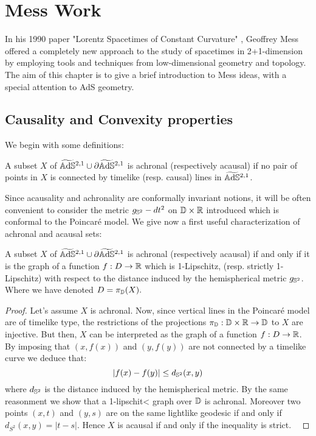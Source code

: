 \chapter{Mess Work}

In his 1990 paper "Lorentz Spacetimes of Constant Curvature" \cite{Mess}, Geoffrey Mess offered a completely new approach to the study of spacetimes in 2+1-dimension by employing tools and techniques from low-dimensional geometry and topology. The aim of this chapter is to give a brief introduction to Mess ideas, with a special attention to AdS geometry. 

\section{Causality and Convexity properties}
We begin with some definitions:
\begin{definition}
    A subset $X$ of $\AS^{2,1}\cup \partial\AS^{2,1}$ is achronal (respectively acausal) if no pair of points in $X$ is connected by timelike (resp. causal) lines in $\AS^{2,1}$.
\end{definition}
Since acausality and achronality are conformally invariant notions, it will be often convenient to consider the metric $g_{\S^2}-dt^2$ on $\D\times\R$ introduced  which is conformal to the Poincaré model. We give now a first useful characterization of achronal and acausal sets:
\begin{lemma}
    A subset $X$ of $\AS^{2,1}\cup \partial\AS^{2,1}$ is achronal (respectively acausal) if and only if it is the graph of a function $f:D\to\R$ which is 1-Lipschitz, (resp. strictly 1-Lipschitz) with respect to the distance induced by the hemispherical metric $g_{\S^2}$.\\
    Where we have denoted $D=\pi_{\D}(X).$ 
\end{lemma}
\begin{proof}
     Let's assume $X$ is achronal. Now, since vertical lines in the Poincaré model are of timelike type, the restrictions of the projections $\pi_\D:\D\times\R\to\D$ to $X$ are injective. But then, $X$ can be interpreted as the graph of a function $f:D\to\R$. By imposing that $(x,f(x))$ and $(y,f(y))$ are not connected by a timelike curve we deduce that: 
     \begin{equation}\label{soloqua}
        |f(x)-f(y)|\leq d_{\S^2}(x,y)
     \end{equation}
     where $d_{\S^2}$ is the distance induced by the hemispherical metric. By the same reasonment we show that a 1-lipschit< graph over $\D$ is achronal. Moreover two points $(x,t)$ and $(y,s)$ are on the same lightlike geodesic if and only if $d_{S^2}(x,y)=|t-s|$. Hence $X$ is acausal if and only if the inequality  is strict. \
\end{proof}


